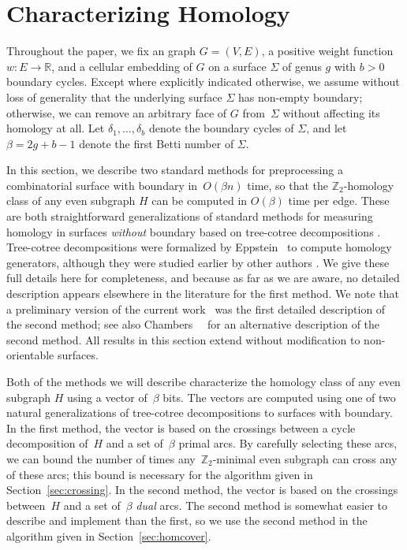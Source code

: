 \documentclass[letterpaper,review]{siamart190516}
\def\Z{\mathbb{Z}}
\def\Real{\mathbb{R}}
\begin{document}
\section{Characterizing Homology}
\label{S:tree-cotree}

Throughout the paper, we fix an  graph $G=(V,E)$, a positive weight function $w\colon E\to \Real$, and a cellular embedding of $G$ on a surface $\Sigma$ of genus $g$ with $b>0$ boundary cycles.
Except where explicitly indicated otherwise, we assume without loss of generality  that the underlying surface $\Sigma$ has non-empty boundary; otherwise, we can remove an arbitrary face of $G$ from~$\Sigma$ without affecting its homology at all.  Let $\delta_1, \dots, \delta_b$ denote the boundary cycles of $\Sigma$, and let $\beta = 2g+b-1$ denote the first Betti number of $\Sigma$.

In this section, we describe two standard methods for preprocessing a combinatorial surface with boundary in~$O(\beta n)$ time, so that the $\Z_2$-homology class of any even subgraph $H$ can be computed in $O(\beta)$ time per edge.  These are both straightforward generalizations of standard methods for measuring homology in surfaces \emph{without} boundary based on tree-cotree decompositions \cite{ew-gohhg-05, ccelw-scsih-08, e-dgteg-03}.
Tree-cotree decompositions were formalized by Eppstein~\cite{e-dgteg-03} to compute homology generators, although they were studied earlier by other authors \cite{b-stdg-71, rs-cseg-84, tr-gctts-98}.
We give these full details here for completeness, and because as far as we are aware, no detailed description appears
elsewhere in the literature for the first method.  We note that a preliminary version of the current
work~\cite{en-mcsnc-11} was the first detailed description of the second method;
see also Chambers~\etal~\cite{bcfn-mchbs-17} for an alternative description of the second method.
All results in this section extend without modification to non-orientable surfaces.


Both of the methods we will describe characterize the homology class of any even subgraph $H$ using a vector of~$\beta$ bits.
The vectors are computed using one of two natural generalizations of tree-cotree decompositions  to surfaces with boundary.
In the first method, the vector is based on the crossings between a cycle decomposition of~$H$ and a set of~$\beta$ primal arcs.
By carefully selecting these arcs, we can bound the number of times any~$\Z_2$-minimal even subgraph can cross any of these arcs; this bound is necessary for the algorithm given in Section~\ref{sec:crossing}.
In the second method, the vector is based on the crossings between~$H$ and a set of~$\beta$ \emph{dual} arcs.
The second method is somewhat easier to describe and implement than the first, so we use the second method in the algorithm given in Section~\ref{sec:homcover}.
\end{document}
